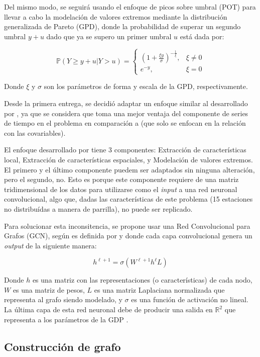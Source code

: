 \documentclass[11pt]{article}
\begin{document}
Del mismo modo, se seguirá usando el enfoque de picos sobre umbral (POT) para llevar a cabo la modelación de valores extremos mediante la distribución generalizada de Pareto (GPD), donde la probabilidad de superar un segundo umbral $y + u$ dado que ya se supero un primer umbral $u$ está dada por:

$$
\mathbb{P} (Y \geq y + u | Y > u) = \begin{cases} 
\left( 1 + \frac{\xi y}{\sigma} \right)^{-\frac{1}{\xi}}, & \xi \neq 0 \\
e^{-y}, & \xi = 0
\end{cases}
$$

Donde $\xi$ y $\sigma$ son los parámetros de forma y escala de la GPD, respectivamente.

Desde la primera entrega, se decidió adaptar un enfoque similar al desarrollado por \citet{wilson2022deepgpd}, ya que se considera que toma una mejor ventaja del componente de series de tiempo en el problema en comparación a \citet{gyarmati2017} (que solo se enfocan en la relación con las covariables).

El enfoque desarrollado por \citet{wilson2022deepgpd} tiene 3 componentes: Extracción de características local, Extracción de características espaciales, y Modelación de valores extremos. El primero y el último componente puedem ser adaptados sin ninguna alteración, pero el segundo, no. Esto es porque este componente requiere de una matriz tridimensional de los datos para utilizarse como el \textit{input} a una red neuronal convolucional, algo que, dadas las características de este problema (15 estaciones no distribuídas a manera de parrilla), no puede ser replicado.

Para solucionar esta inconsitencia, se propone usar una Red Convolucional para Grafos (GCN), según es definida por \citet{Bacciu2020GentleIntro} y donde cada capa convolucional genera un \textit{output} de la siguiente manera:

$$
h^{\ell + 1} = \sigma \left( W^{\ell+1} h^{\ell} L \right)
$$

Donde $h$ es una matriz con las representaciones (o características) de cada nodo, $W$ es una matriz de pesos, $L$ es una matriz Laplaciana normalizada que representa al grafo siendo modelado, y $\sigma$ es una función de activación no lineal. La última capa de esta red neuronal debe de producir una salida en $\mathbb{R}^{2}$ que representa a los parámetros de la GDP \citep{wilson2022deepgpd}.

\subsection{Construcción de grafo}
\end{document}
